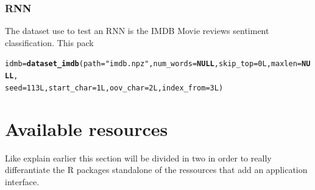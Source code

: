 \documentclass[6pt,letter]{article}\usepackage[]{graphicx}\usepackage[]{color}
\makeatletter
\newcommand{\hlnum}[1]{\textcolor[rgb]{0.686,0.059,0.569}{#1}}%
\newcommand{\hlstr}[1]{\textcolor[rgb]{0.192,0.494,0.8}{#1}}%
\newcommand{\hlstd}[1]{\textcolor[rgb]{0.345,0.345,0.345}{#1}}%
\newcommand{\hlkwa}[1]{\textcolor[rgb]{0.161,0.373,0.58}{\textbf{#1}}}%
\newcommand{\hlkwb}[1]{\textcolor[rgb]{0.69,0.353,0.396}{#1}}%
\newcommand{\hlkwc}[1]{\textcolor[rgb]{0.333,0.667,0.333}{#1}}%
\newcommand{\hlkwd}[1]{\textcolor[rgb]{0.737,0.353,0.396}{\textbf{#1}}}%
\newenvironment{kframe}{%
 \def\at@end@of@kframe{}%
 \ifinner\ifhmode%
  \def\at@end@of@kframe{\end{minipage}}%
  \begin{minipage}{\columnwidth}%
 \fi\fi%
 \def\FrameCommand##1{\hskip\@totalleftmargin \hskip-\fboxsep
 \colorbox{shadecolor}{##1}\hskip-\fboxsep
     \hskip-\linewidth \hskip-\@totalleftmargin \hskip\columnwidth}%
 \MakeFramed {\advance\hsize-\width
   \@totalleftmargin\z@ \linewidth\hsize
   \@setminipage}}%
 {\par\unskip\endMakeFramed%
 \at@end@of@kframe}
\newenvironment{knitrout}{}{} %
\makeatother
\begin{document}
\subsubsection{RNN}
The dataset use to test an RNN is the IMDB Movie reviews sentiment classification. This pack
\begin{knitrout}
\color{fgcolor}\begin{kframe}
\begin{alltt}
\hlstd{idmb} \hlkwb{=} \hlkwd{dataset_imdb}\hlstd{(}  \hlkwc{path} \hlstd{=} \hlstr{"imdb.npz"}\hlstd{,} \hlkwc{num_words} \hlstd{=} \hlkwa{NULL}\hlstd{,} \hlkwc{skip_top} \hlstd{=} \hlnum{0L}\hlstd{,} \hlkwc{maxlen} \hlstd{=} \hlkwa{NULL}\hlstd{,}
                      \hlkwc{seed} \hlstd{=} \hlnum{113L}\hlstd{,} \hlkwc{start_char} \hlstd{=} \hlnum{1L}\hlstd{,} \hlkwc{oov_char} \hlstd{=} \hlnum{2L}\hlstd{,} \hlkwc{index_from} \hlstd{=} \hlnum{3L}\hlstd{)}
\end{alltt}
\end{kframe}
\end{knitrout}

\section{Available resources}
\label{sec:avail_ressour}
Like explain earlier this section will be divided in two in order to really differantiate the R packages standalone of the ressources that add an application interface.
\end{document}
